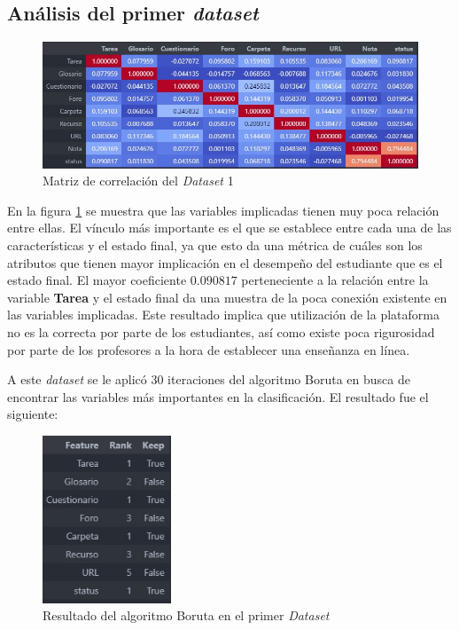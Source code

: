 \subsection{Análisis del primer \textit{dataset}}

\begin{figure}[htb]
    \centering
    \includegraphics[width = 1 \textwidth]{Graphics/corr_dataset1.jpg}
    \caption{Matriz de correlación del \textit{Dataset} 1}
    \label{dataset1_corr}
\end{figure}  


En la figura \ref*{dataset1_corr} se muestra que las variables implicadas tienen muy poca relación entre ellas. El vínculo más importante es el que se establece entre cada una de las características y el estado final, ya que esto da una métrica de cuáles son los atributos que tienen mayor implicación 
en el desempeño del estudiante que es el estado final. El mayor coeficiente $0.090817$ perteneciente a la relación 
entre la variable \textbf{Tarea} y el estado final da una muestra de la poca conexión existente en las variables implicadas. Este resultado implica que utilización de la plataforma no es la correcta por parte de los estudiantes, así como existe poca rigurosidad por parte de los profesores a la hora de establecer una enseñanza en línea.  

A este \textit{dataset} se le aplicó 30 iteraciones del algoritmo Boruta en busca de encontrar las variables más importantes en la clasificación. El resultado fue el siguiente:   


\begin{figure}[htbp]
    \centering
    \includegraphics[height=5cm]{Graphics/boruta_dataset1.jpg}
    \caption{Resultado del algoritmo Boruta en el primer \textit{Dataset}}
    \label{boruta1}
\end{figure}   



